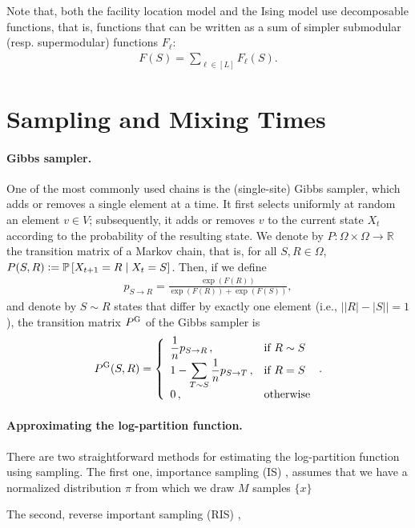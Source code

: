 Note that, both the facility location model and the Ising model use decomposable functions, that is, functions that can be written as a sum of simpler submodular (resp. supermodular) functions $F_{\ell}$:
\begin{align} \label{eq:fdec}
F(S) = \sum_{\ell \in [L]} F_{\ell}(S).
\end{align}

\section{Sampling and Mixing Times}

\paragraph{Gibbs sampler.}
One of the most commonly used chains is the (single-site) Gibbs sampler, which adds or removes a single element %
at a time.
It first selects uniformly at random an element $v \in V$; subsequently, it adds or removes $v$ to the current state $X_t$ according to the probability of the resulting state.
We denote by $P : \Omega \times \Omega \to \mathbb{R}$ the transition matrix of a Markov chain, that is, for all $S, R \in \Omega$, $P(S, R) \vcentcolon= \mathbb{P}\left[ X_{t+1} = R \mid X_t = S \right]$.
Then, if we define
\begin{align*}
p_{S \rightarrow R} = \displaystyle\frac{\exp(F(R))}{\exp(F(R)) + \exp(F(S))},
\end{align*}
and denote by $S \sim R$ states that differ by exactly one element (i.e., $\big||R| - |S|\big| = 1$),
the transition matrix $P^{\mathrm{G}}$ of the Gibbs sampler is
\begin{align*}
  P^{\mathrm{G}}(S, R) = 
  \left\{ \begin{array}{ll} \displaystyle\frac{1}{n}p_{S \rightarrow R}\,,& \mbox{if } R \sim S \\ 1 - \displaystyle\sum_{T \sim S} \displaystyle\frac{1}{n}p_{S \rightarrow T}\,,& \mbox{if } R = S \\ 0\,,& \mbox{otherwise} \end{array} \right..
\end{align*}

\paragraph{Approximating the log-partition function.}
There are two straightforward methods for estimating the log-partition function using sampling.
The first one, importance sampling (IS) \citep{ais}, assumes that we have a normalized distribution $\pi$ from which we draw $M$ samples $\{x\}$

The second, reverse important sampling (RIS) \citep{ris},

